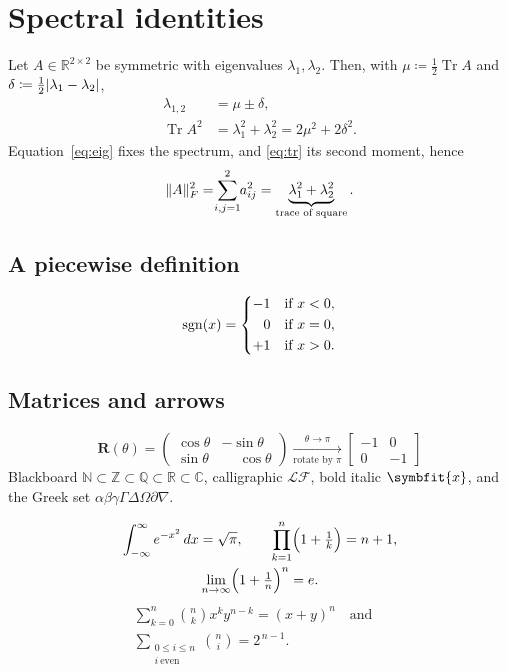 \documentclass[11pt]{article}
\DeclarePairedDelimiter{\abs}{\lvert}{\rvert}
\DeclarePairedDelimiter{\norm}{\lVert}{\rVert}
\DeclareMathOperator{\Tr}{Tr}
\begin{document}
\section*{Spectral identities}

Let $A\in\mathbb{R}^{2\times 2}$ be symmetric with eigenvalues $\lambda_1,\lambda_2$.
Then, with $\mu \coloneqq \tfrac12\Tr A$ and $\delta \coloneqq \tfrac12\abs{\lambda_1-\lambda_2}$,
\begin{align}
  \lambda_{1,2} &= \mu \pm \delta, \label{eq:eig}\\
  \Tr A^{2} &= \lambda_1^{2}+\lambda_2^{2} = 2\mu^{2}+2\delta^{2}. \label{eq:tr}
\end{align}
Equation~\eqref{eq:eig} fixes the spectrum, and \eqref{eq:tr} its second moment, hence
\begin{equation}
  \norm{A}_{F}^{2} = \sum_{\mathclap{i,j=1}}^{2} a_{ij}^{2}
  = \underbrace{\lambda_1^{2}+\lambda_2^{2}}_{\text{trace of square}}.
  \label{eq:frob}
\end{equation}

\subsection*{A piecewise definition}
\[
  \operatorname{sgn}(x)=
  \begin{dcases}
    -1 & \text{if } x<0,\\
    \phantom{-}0 & \text{if } x=0,\\
    +1 & \text{if } x>0.
  \end{dcases}
\]

\subsection*{Matrices and arrows}
\[
  \mathbf{R}(\theta)=\begin{pmatrix}\cos\theta & -\sin\theta\\ \sin\theta & \phantom{-}\cos\theta\end{pmatrix}
  \xrightarrow[\text{rotate by }\pi]{\theta\to\pi}
  \begin{bmatrix}-1&0\\0&-1\end{bmatrix}
\]
Blackboard $\mathbb{N}\subset\mathbb{Z}\subset\mathbb{Q}\subset\mathbb{R}\subset\mathbb{C}$,
calligraphic $\mathcal{L}\mathcal{F}$, bold italic $\symbfit{x}$,
and the Greek set $\alpha\beta\gamma\Gamma\Delta\Omega\partial\nabla$.

\begin{gather*}
  \int_{-\infty}^{\infty} e^{-x^{2}}\,dx=\sqrt{\pi},\qquad
  \prod_{k=1}^{n}\Bigl(1+\tfrac{1}{k}\Bigr)=n+1,\\
  \lim_{n\to\infty}\Bigl(1+\tfrac1n\Bigr)^{n}=e.
\end{gather*}
\begin{multline}
  \sum_{k=0}^{n}\binom{n}{k}x^{k}y^{n-k}=(x+y)^{n}
  \quad\text{and}\quad\\
  \sum_{\substack{0\le i\le n\\ i\ \text{even}}}\binom{n}{i}=2^{\,n-1}.
\end{multline}
\end{document}
